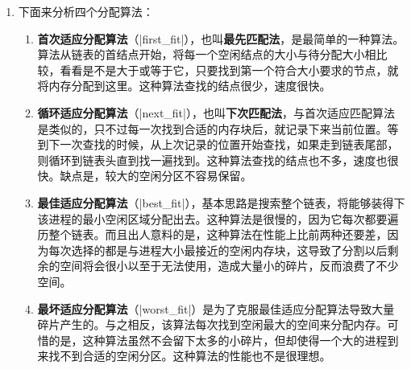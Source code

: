 \documentclass[c5size,a4paper,nofonts]{ctexart}
\begin{document}
\begin{enumerate}
\item 下面来分析四个分配算法：
\begin{enumerate}
\item {\bf 首次适应分配算法}（|first_fit|），也叫{\bf 最先匹配法}，是最简单的一种算法。算法从链表的首结点开始，将每一个空闲结点的大小与待分配大小相比较，看看是不是大于或等于它，只要找到第一个符合大小要求的节点，就将内存分配到这里。这种算法查找的结点很少，速度很快。
\item {\bf 循环适应分配算法}（|next_fit|），也叫{\bf 下次匹配法}，与首次适应匹配算法是类似的，只不过每一次找到合适的内存块后，就记录下来当前位置。等到下一次查找的时候，从上次记录的位置开始查找，如果走到链表尾部，则循环到链表头直到找一遍找到。这种算法查找的结点也不多，速度也很快。缺点是，较大的空闲分区不容易保留。
\item {\bf 最佳适应分配算法}（|best_fit|），基本思路是搜索整个链表，将能够装得下该进程的最小空闲区域分配出去。这种算法是很慢的，因为它每次都要遍历整个链表。而且出人意料的是，这种算法在性能上比前两种还要差，因为每次选择的都是与进程大小最接近的空闲内存块，这导致了分割以后剩余的空间将会很小以至于无法使用，造成大量小的碎片，反而浪费了不少空间。
\item {\bf 最坏适应分配算法}（|worst_fit|）是为了克服最佳适应分配算法导致大量碎片产生的。与之相反，该算法每次找到空闲最大的空间来分配内存。可惜的是，这种算法虽然不会留下太多的小碎片，但却使得一个大的进程到来找不到合适的空闲分区。这种算法的性能也不是很理想。
\end{enumerate}

\end{enumerate}
\end{document}
